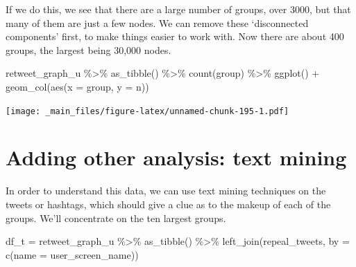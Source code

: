 \documentclass[
]{book}
\newenvironment{Shaded}{\begin{snugshade}}{\end{snugshade}}
\newcommand{\AttributeTok}[1]{\textcolor[rgb]{0.77,0.63,0.00}{#1}}
\newcommand{\FunctionTok}[1]{\textcolor[rgb]{0.00,0.00,0.00}{#1}}
\newcommand{\NormalTok}[1]{#1}
\newcommand{\OtherTok}[1]{\textcolor[rgb]{0.56,0.35,0.01}{#1}}
\newcommand{\SpecialCharTok}[1]{\textcolor[rgb]{0.00,0.00,0.00}{#1}}
\newcommand{\StringTok}[1]{\textcolor[rgb]{0.31,0.60,0.02}{#1}}
\begin{document}
If we do this, we see that there are a large number of groups, over 3000, but that many of them are just a few nodes. We can remove these `disconnected components' first, to make things easier to work with. Now there are about 400 groups, the largest being 30,000 nodes.

\begin{Shaded}
\begin{Highlighting}[]
\NormalTok{retweet\_graph\_u }\SpecialCharTok{\%\textgreater{}\%} \FunctionTok{as\_tibble}\NormalTok{() }\SpecialCharTok{\%\textgreater{}\%} \FunctionTok{count}\NormalTok{(group) }\SpecialCharTok{\%\textgreater{}\%} \FunctionTok{ggplot}\NormalTok{() }\SpecialCharTok{+} \FunctionTok{geom\_col}\NormalTok{(}\FunctionTok{aes}\NormalTok{(}\AttributeTok{x =}\NormalTok{ group, }\AttributeTok{y =}\NormalTok{ n))}
\end{Highlighting}
\end{Shaded}

\texttt{[image: \_main\_files/figure-latex/unnamed-chunk-195-1.pdf]}

\hypertarget{adding-other-analysis-text-mining}{%
\section{Adding other analysis: text mining}\label{adding-other-analysis-text-mining}}

In order to understand this data, we can use text mining techniques on the tweets or hashtags, which should give a clue as to the makeup of each of the groups. We'll concentrate on the ten largest groups.

\begin{Shaded}
\begin{Highlighting}[]
\NormalTok{df\_t }\OtherTok{=}\NormalTok{ retweet\_graph\_u }\SpecialCharTok{\%\textgreater{}\%} \FunctionTok{as\_tibble}\NormalTok{() }\SpecialCharTok{\%\textgreater{}\%}  \FunctionTok{left\_join}\NormalTok{(repeal\_tweets, }\AttributeTok{by =} \FunctionTok{c}\NormalTok{(}\StringTok{\textquotesingle{}name\textquotesingle{}} \OtherTok{=} \StringTok{\textquotesingle{}user\_screen\_name\textquotesingle{}}\NormalTok{))}
\end{Highlighting}
\end{Shaded}
\end{document}
